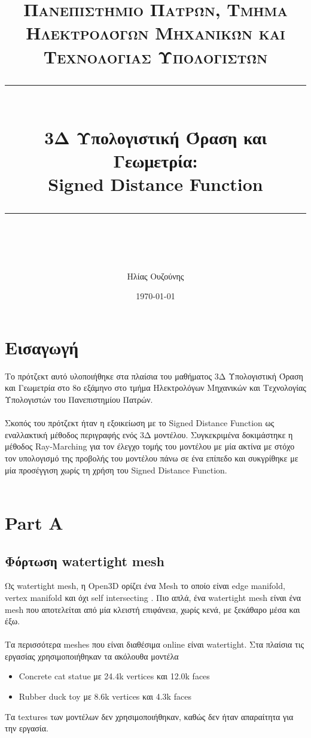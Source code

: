 \documentclass{report}
\title{	
	\normalfont\normalsize
	\textsc{Πανεπιστήμιο Πατρών, Τμήμα Ηλεκτρολόγων Μηχανικών και Τεχνολογίας Υπολογιστών}\\ %
	\vspace{25pt} %
	\rule{\linewidth}{0.5pt}\\ %
	\vspace{20pt} %
	{\huge 3Δ Υπολογιστική Όραση και Γεωμετρία: \\ Signed Distance Function}\\ %
	\vspace{12pt} %
	\rule{\linewidth}{2pt}\\ %
	\vspace{12pt} %
}
\author{\LARGE Ηλίας Ουζούνης \\ \en{up1083749}} %
\date{\normalsize\today} %
\begin{document}
\maketitle
\newpage

\sloppy
\tableofcontents
\newpage

\chapter{Εισαγωγή}
Το πρότζεκτ αυτό υλοποιήθηκε στα πλαίσια του μαθήματος 3Δ Υπολογιστική Όραση και Γεωμετρία στο 8ο εξάμηνο στο τμήμα Ηλεκτρολόγων
Μηχανικών και Τεχνολογίας Υπολογιστών του Πανεπιστημίου Πατρών.
\\\\
Σκοπός του πρότζεκτ ήταν η εξοικείωση με το Signed Distance Function ως εναλλακτική μέθοδος περιγραφής ενός 3Δ μοντέλου. 
Συγκεκριμένα δοκιμάστηκε η μέθοδος Ray-Marching για τον έλεγχο τομής του μοντέλου με μία ακτίνα με στόχο τον υπολογισμό
της προβολής του μοντέλου πάνω σε ένα επίπεδο και συκγρίθηκε με μία προσέγγιση χωρίς τη χρήση του Signed Distance Function.
\\\\

\chapter{Part A}
\section{Φόρτωση watertight mesh}

Ως watertight mesh, η Open3D ορίζει ένα Mesh το οποίο είναι edge manifold, vertex manifold και όχι self intersecting \cite{open3d}. 
Πιο απλά, ένα watertight mesh είναι ένα mesh που αποτελείται από μία κλειστή επιφάνεια, χωρίς κενά, με ξεκάθαρο μέσα και έξω. 
\\\\
Τα περισσότερα meshes που είναι διαθέσιμα online είναι watertight. Στα πλαίσια τις εργασίας χρησιμοποιήθηκαν τα ακόλουθα μοντέλα
\begin{itemize}
    \item Concrete cat statue \cite{concrete-cat-statue} με 24.4k vertices και 12.0k faces
    \item Rubber duck toy \cite{rubber-duck-toy} με 8.6k vertices και 4.3k faces
\end{itemize}

Τα textures των μοντέλων δεν χρησιμοποιήθηκαν, καθώς δεν ήταν απαραίτητα για την εργασία.
\end{document}
